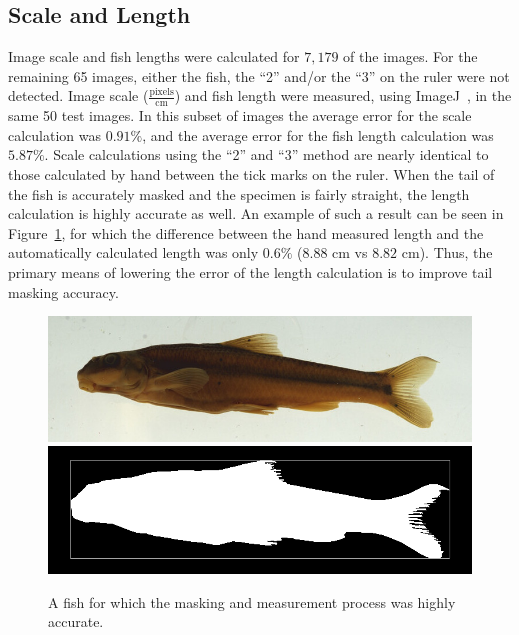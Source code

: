 \documentclass[conference]{IEEEtran}
\begin{document}
\subsection{Scale and Length}
Image scale and fish lengths were calculated for \(7,179\) of the images.
For the remaining 65 images, either the fish, the ``2'' and/or the ``3'' on the ruler were not detected.
Image scale ($\frac{\mathrm{pixels}}{\mathrm{cm}}$) and fish length were
measured, using ImageJ~\cite{imagejCite}, in the same 50 test images.
In this subset of images the average error for the scale calculation
was \(0.91\%\), and the average error for the fish length calculation was \(5.87\%\).
Scale calculations using the ``2'' and ``3'' method are nearly identical to those calculated by hand between the tick marks on the ruler. When the tail of the fish is accurately masked and the specimen is fairly straight, the length calculation is highly accurate as well. An example of such a result can be seen in Figure~\ref{fig:scale_len}, for which the difference between the hand measured length and the automatically calculated length was only \(0.6\%\) (\(8.88\) cm vs \(8.82\) cm). Thus, the primary means of lowering the error of the length calculation is to improve tail masking accuracy.
\begin{figure}[H]
  \centering
  \includegraphics[width=0.49\linewidth]{images/54172}
  \includegraphics[width=0.49\linewidth]{images/54172_mask}
  \caption{A fish for which the masking and measurement process was highly accurate.}
  \label{fig:scale_len}
\end{figure}
\end{document}

